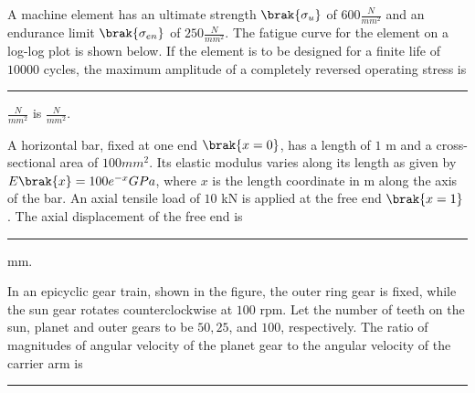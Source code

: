 \item{
A machine element has an ultimate strength $\brak{\sigma_u}$ of $600\frac{N}{mm^2}$ and an endurance limit $\brak{\sigma_{en}}$ of $250\frac{N}{mm^2}$. The fatigue curve for the element on a log-log plot is shown below. If the element is to be designed for a finite life of $10000$ cycles, the maximum amplitude of a completely reversed operating stress is \rule{2cm}{0.15mm} $\frac{N}{mm^2}$ 
 is $\frac{N}{mm^2}$.
 \begin{figure}[H]
\centering
\resizebox{5cm}{!}{%
\begin{ircuitikz}
\tikzstyle{every ode}=[font=\normalsize]
\draw [->, >=Stealth] (5.25,7) -- (5.25,12);
\draw [->, >=Stealth] (5.25,7) -- (10.5,7);
\draw [dashed] (5.25,8.75) -- (7,8.75);
\draw [dashed] (7,8.75) -- (7,7);
\draw [short] (5.25,10.25) -- (7,8.75);
\draw [short] (7,8.75) -- (9.25,8.75);
\node [font=\normalsize] at (4.5,10.25) {A};
\node [font=\normalsize] at (5.75,10.5) {$0.8\sigma_u$};
\node [font=\normalsize] at (4.75,8.75) {$\sigma_{en}$};
\node [font=\normalsize] at (5,6.5) {$10^3$};
\node [font=\normalsize] at (7,6.5) {$10^6$};
\node [font=\normalsize] at (7.25,9) {B};
\node [font=\normalsize] at (7.5,5.75) {No. of cycles};
\node [font=\normalsize, rotate around={90:(0,0)}] at (3.5,9) {Faliure Stress};
\end{circuitikz}
}%

\label{fig:my_label}
\end{figure}
}
\item{
A horizontal bar, fixed at one end $\brak{x = 0}$, has a length of $1$ m and a cross-sectional area of $100mm^2$. Its elastic modulus varies along its length as given by $E\brak{x}=100e^{-x}GPa$, where $x$ is the length coordinate in m along the axis of the bar. An axial tensile load of $10$ kN is applied at the free end $\brak{x=1}$. The axial displacement of the free end is \rule{2cm}{0.15mm} mm.}
\item{
In an epicyclic gear train, shown in the figure, the outer ring gear is fixed, while the sun gear rotates counterclockwise at $100$ rpm. Let the number of teeth on the sun, planet and outer gears to be $50, 25$, and $100$, respectively. The ratio of magnitudes of angular velocity of the planet gear to the angular velocity of the carrier arm is \rule{3cm}{0.15mm}
\begin{figure}[H]
\centering
{}%

\label{fig:my_label}
\end{figure}}
